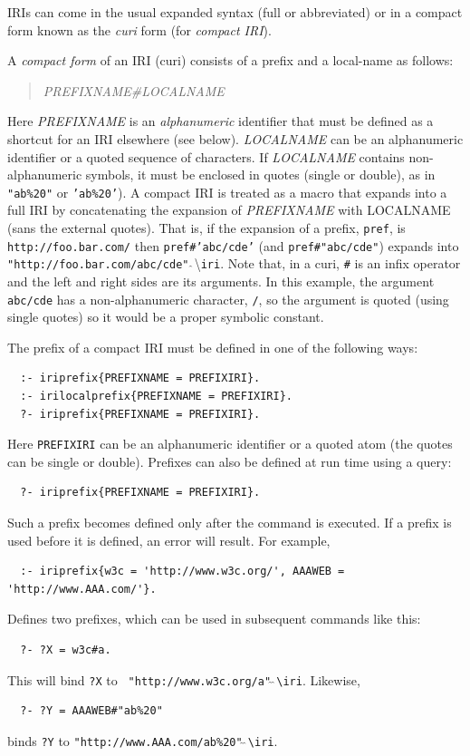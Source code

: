 \documentclass[11pt]{article}
\newcommand{\bs}{\textbackslash}
\begin{document}
IRIs can come in the usual expanded syntax (full or abbreviated)
or in a compact form
known as the \emph{curi} form (for \emph{compact IRI}).  

\index{\#}
A \emph{compact form} of an IRI (curi) consists of a
prefix and a local-name as follows:
\begin{quote}
 \emph{PREFIXNAME\#LOCALNAME} 
\end{quote}
Here
\emph{PREFIXNAME} is an \emph{alphanumeric} identifier that must be defined as a
shortcut for an IRI elsewhere (see below). \emph{LOCALNAME} can be
an alphanumeric identifier or a quoted sequence of characters. If \emph{LOCALNAME} contains
non-alphanumeric symbols, it must be enclosed in quotes (single or double),
as in {\tt "ab\%20"} or \texttt{'ab\%20'}).
A compact IRI is treated as a macro that expands into a full IRI
by concatenating the expansion of \emph{PREFIXNAME}
with LOCALNAME (sans the external quotes).
That is, if the expansion of a prefix, \texttt{pref}, is
\texttt{http://foo.bar.com/}
then \texttt{pref\#'abc/cde'} (and \texttt{pref\#"abc/cde"}) expands into
\texttt{"http://foo.bar.com/abc/cde"}$\hat{~}\hat{~}$\bs{}\texttt{iri}.
Note that, in a curi, \texttt{\#} is an infix operator and the left and
right sides are its arguments. In this example, the argument
\texttt{abc/cde}  has a non-alphanumeric character, \texttt{/}, so the
argument is
quoted (using single quotes) so it would be a proper symbolic constant.
    

The prefix of a compact IRI must be defined in one of the following ways:
\begin{verbatim}
  :- iriprefix{PREFIXNAME = PREFIXIRI}. 
  :- irilocalprefix{PREFIXNAME = PREFIXIRI}. 
  ?- iriprefix{PREFIXNAME = PREFIXIRI}. 
\end{verbatim}
Here {\tt PREFIXIRI}  can be an alphanumeric identifier or a
quoted atom (the quotes can be single or double). Prefixes can also be defined at run time using a query:
\begin{verbatim}
  ?- iriprefix{PREFIXNAME = PREFIXIRI}. 
\end{verbatim}
Such a prefix becomes defined only after the command is executed.
If a prefix is used before it is defined, an error will result.
For example,
\begin{verbatim}
  :- iriprefix{w3c = 'http://www.w3c.org/', AAAWEB = 'http://www.AAA.com/'}. 
\end{verbatim}
Defines two prefixes, which can be used in subsequent commands like this:
\begin{verbatim}
  ?- ?X = w3c#a.
\end{verbatim}
This will bind {\tt ?X} to   {\tt
  "http://www.w3c.org/a"$\hat{~}\hat{~}$\bs{}iri}. 
Likewise,
\begin{verbatim}
  ?- ?Y = AAAWEB#"ab%20" 
\end{verbatim}
binds {\tt ?Y} to {\tt "http://www.AAA.com/ab\%20"$\hat{~}\hat{~}$\bs{}iri}. 
\end{document}
